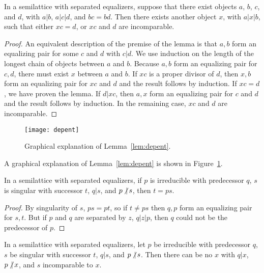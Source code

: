 \documentclass[11pt]{llncs}
\begin{document}
{\begin{lemma}
\label{lem:depent}
In a semilattice with separated equalizers, suppose that there exist objects $a$, $b$, $c$, and $d$, with $a|b$, $a|c|d$, and $bc=bd$. Then there exists another object $x$, with $a|x|b$, such that either $xc=d$, or  $xc$ and $d$ are incomparable.
\end{lemma}

\begin{proof}
An equivalent description of the premise of the lemma is that $a,b$ form an equalizing pair for some $c$ and $d$ with $c|d$. We use induction on the length of the longest chain of objects between $a$ and $b$. Because $a,b$ form an equalizing pair for $c,d$, there must exist $x$ between $a$ and $b$.
If $xc$ is a proper divisor of $d$, then $x,b$ form an equalizing pair for $xc$ and $d$ and the result follows by induction.  If $xc=d$, we have proven the lemma. If $d|xc$, then $a,x$ form an equalizing pair for $c$ and $d$ and the result follows by induction. In the remaining case, $xc$ and $d$ are incomparable.
\end{proof}

\begin{figure}[t]
\centering\texttt{[image: depent]}
\caption{Graphical explanation of Lemma~\ref{lem:depent}.}
\label{fig:depent}
\end{figure}

A graphical explanation of Lemma~\ref{lem:depent} is shown in Figure~\ref{fig:depent}.

\begin{lemma}
\label{lem:sing-is-max}
In a semilattice with separated equalizers, if $p$ is irreducible with predecessor $q$, $s$ is singular with successor $t$, $q|s$, and $p\mathop{\not|} s$, then $t=ps$.
\end{lemma}

\begin{proof}
By singularity of $s$, $ps=pt$, so if $t\ne ps$ then $q,p$ form an equalizing pair for $s,t$. But if $p$ and $q$ are separated by $z$, $q|z|p$, then $q$ could not be the predecessor of $p$.
\end{proof}

\begin{lemma}
\label{lem:irredsingeq}
In a semilattice with separated equalizers, let $p$ be irreducible with predecessor $q$,
$s$ be singular with successor $t$, $q|s$, and $p\mathop{\not|} s$. Then there can be no $x$ with $q|x$, $p\mathop{\not|} x$, and $s$ incomparable to $x$.
\end{lemma}

}
\end{document}

